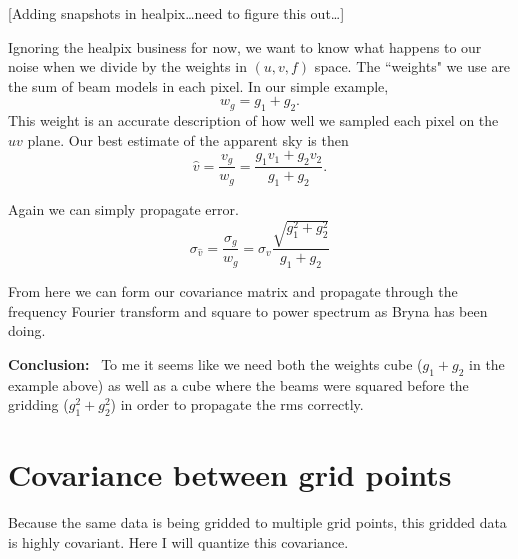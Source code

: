 \documentclass{article}
\begin{document}
\vspace{.2cm}
[Adding snapshots in healpix\ldots need to figure this out\ldots]
\vspace{.2cm}

Ignoring the healpix business for now, we want to know what happens to our noise when we divide by the weights in $(u,v,f)$ space. The ``weights" we use are the sum of beam models in each pixel. In our simple example,
\begin{equation}
w_g = g_1 + g_2.
\end{equation}
This weight is an accurate description of how well we sampled each pixel on the $uv$ plane. Our best estimate of the apparent sky is then
\begin{equation}
\hat{v} = \frac{v_g}{w_g} = \frac{g_1v_1+g_2v_2}{g_1+g_2}.
\end{equation}

Again we can simply propagate error.
\begin{equation}
\sigma_{\hat{v}} = \frac{\sigma_g}{w_g} = \sigma_v \frac{\sqrt{g_1^2 + g_2^2}}{g_1 + g_2}
\end{equation}

From here we can form our covariance matrix and propagate through the frequency Fourier transform and square to power spectrum as Bryna has been doing.

{\bf Conclusion:} \, To me it seems like we need both the weights cube ($g_1 + g_2$ in the example above) as well as a cube where the beams were squared before the gridding ($g_1^2 + g_2^2$) in order to propagate the rms correctly.

\section{Covariance between grid points}
Because the same data is being gridded to multiple grid points, this gridded data is highly covariant. Here I will quantize this covariance.
\end{document}
